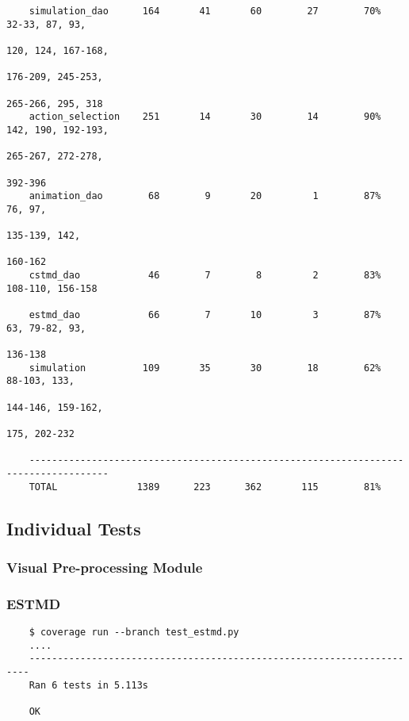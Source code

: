 \documentclass[a4paper,11pt]{article}
\begin{document}
\begin{verbatim}
    simulation_dao      164       41       60        27        70%   32-33, 87, 93, 
                                                                     120, 124, 167-168, 
                                                                     176-209, 245-253, 
                                                                     265-266, 295, 318
    action_selection    251       14       30        14        90%   142, 190, 192-193, 
                                                                     265-267, 272-278, 
                                                                     392-396
    animation_dao        68        9       20         1        87%   76, 97, 
    	                                                                 135-139, 142, 
    	                                                                 160-162
    cstmd_dao            46        7        8         2        83%   108-110, 156-158 
                                                                                                                
    estmd_dao            66        7       10         3        87%   63, 79-82, 93, 
                                                                     136-138
    simulation          109       35       30        18        62%   88-103, 133, 
                                                                     144-146, 159-162, 
                                                                     175, 202-232

    ------------------------------------------------------------------------------------
    TOTAL              1389      223      362       115        81%  
    \end{verbatim}
    
    
\subsection{Individual Tests}
\subsubsection{Visual Pre-processing Module}
\subsubsection*{{\hspace{6mm}}ESTMD}
\begin{verbatim}
    $ coverage run --branch test_estmd.py
    ....
    ----------------------------------------------------------------------
    Ran 6 tests in 5.113s

    OK
\end{verbatim}
\end{document}

